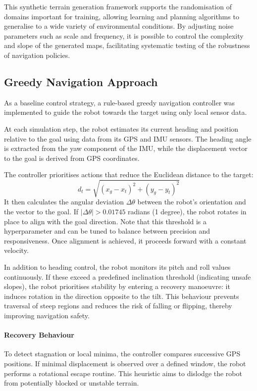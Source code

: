 \documentclass[conference]{IEEEtran}
\begin{document}
This synthetic terrain generation framework supports the randomisation of domains important for training, allowing learning and planning algorithms to generalise to a wide variety of environmental conditions. By adjusting noise parameters such as scale and frequency, it is possible to control the complexity and slope of the generated maps, facilitating systematic testing of the robustness of navigation policies.

\subsection{Greedy Navigation Approach}

As a baseline control strategy, a rule-based greedy navigation controller was implemented to guide the robot towards the target using only local sensor data.

At each simulation step, the robot estimates its current heading and position relative to the goal using data from its GPS and IMU sensors. The heading angle is extracted from the yaw component of the IMU, while the displacement vector to the goal is derived from GPS coordinates.

The controller prioritises actions that reduce the Euclidean distance to the target:
\[
d_t = \sqrt{(x_g - x_t)^2 + (y_g - y_t)^2}
\]
It then calculates the angular deviation \(\Delta\theta\) between the robot's orientation and the vector to the goal. If \(|\Delta\theta| > 0.01745\) radians (1 degree), the robot rotates in place to align with the goal direction. Note that this threshold is a hyperparameter and can be tuned to balance between precision and responsiveness. Once alignment is achieved, it proceeds forward with a constant velocity.

In addition to heading control, the robot monitors its pitch and roll values continuously. If these exceed a predefined inclination threshold (indicating unsafe slopes), the robot prioritises stability by entering a recovery manoeuvre: it induces rotation in the direction opposite to the tilt. This behaviour prevents traversal of steep regions and reduces the risk of falling or flipping, thereby improving navigation safety.

\paragraph{Recovery Behaviour}

To detect stagnation or local minima, the controller compares successive GPS positions. If minimal displacement is observed over a defined window, the robot performs a rotational escape routine. This heuristic aims to dislodge the robot from potentially blocked or unstable terrain.
\end{document}
